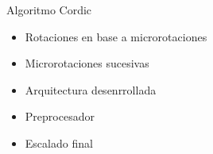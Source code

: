 \begin{frame}{Algoritmo Cordic}
  \begin{itemize}
    \item<1-> Rotaciones en base a microrotaciones
    \item<2-> Microrotaciones sucesivas
    \item<4-> Arquitectura desenrrollada
    \item<5-> Preprocesador
    \item<6-> Escalado final
  \end{itemize}
  

\end{frame}
